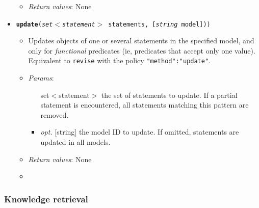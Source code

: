 \begin{itemize}
\begin{itemize}
\item  \emph{Return values}: None
\end{itemize}

\item  \texttt{\textbf{update}(\emph{set$<$statement$>$} statements, [\emph{string} model]))}
\begin{itemize}
\item  Updates objects of one or several statements in the specified model, and only for \emph{functional} predicates (ie, predicates that accept only one value). Equivalent to \texttt{revise} with the policy \texttt{{"method":"update"}}.
\item  \emph{Params}:
\begin{itemize}
\item  [set$<$statement$>$] the set of statements to update. If a partial statement is encountered, all statements matching this pattern are removed.
\item  \emph{opt.} [string] the model ID to update. If omitted, statements are updated in all models. 
\end{itemize}

\item  \emph{Return values}: None
\item  
\end{itemize}

\end{itemize}

\subsubsection{Knowledge retrieval}



